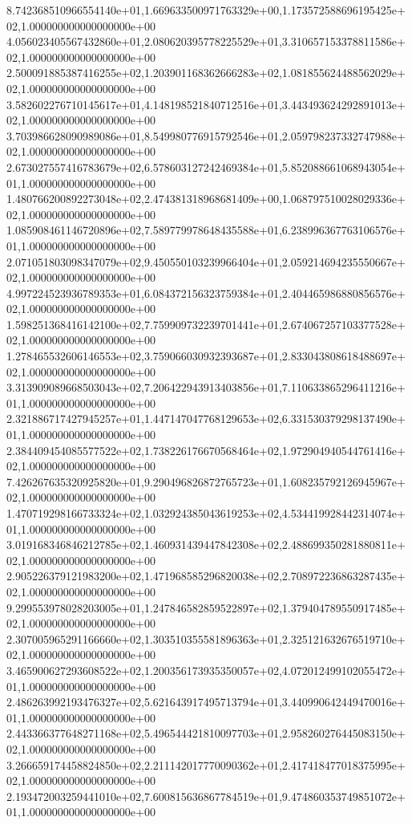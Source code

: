 8.742368510966554140e+01,1.669633500971763329e+00,1.173572588696195425e+02,1.000000000000000000e+00
4.056023405567432860e+01,2.080620395778225529e+01,3.310657153378811586e+02,1.000000000000000000e+00
2.500091885387416255e+02,1.203901168362666283e+02,1.081855624488562029e+02,1.000000000000000000e+00
3.582602276710145617e+01,4.148198521840712516e+01,3.443493624292891013e+02,1.000000000000000000e+00
3.703986628090989086e+01,8.549980776915792546e+01,2.059798237332747988e+02,1.000000000000000000e+00
2.673027557416783679e+02,6.578603127242469384e+01,5.852088661068943054e+01,1.000000000000000000e+00
1.480766200892273048e+02,2.474381318968681409e+00,1.068797510028029336e+02,1.000000000000000000e+00
1.085908461146720896e+02,7.589779978648435588e+01,6.238996367763106576e+01,1.000000000000000000e+00
2.071051803098347079e+02,9.450550103239966404e+01,2.059214694235550667e+02,1.000000000000000000e+00
4.997224523936789353e+01,6.084372156323759384e+01,2.404465986880856576e+02,1.000000000000000000e+00
1.598251368416142100e+02,7.759909732239701441e+01,2.674067257103377528e+02,1.000000000000000000e+00
1.278465532606146553e+02,3.759066030932393687e+01,2.833043808618488697e+02,1.000000000000000000e+00
3.313909089668503043e+02,7.206422943913403856e+01,7.110633865296411216e+01,1.000000000000000000e+00
2.321886717427945257e+01,1.447147047768129653e+02,6.331530379298137490e+01,1.000000000000000000e+00
2.384409454085577522e+02,1.738226176670568464e+02,1.972904940544761416e+02,1.000000000000000000e+00
7.426267635320925820e+01,9.290496826872765723e+01,1.608235792126945967e+02,1.000000000000000000e+00
1.470719298166733324e+02,1.032924385043619253e+02,4.534419928442314074e+01,1.000000000000000000e+00
3.019168346846212785e+02,1.460931439447842308e+02,2.488699350281880811e+02,1.000000000000000000e+00
2.905226379121983200e+02,1.471968585296820038e+02,2.708972236863287435e+02,1.000000000000000000e+00
9.299553978028203005e+01,1.247846582859522897e+02,1.379404789550917485e+02,1.000000000000000000e+00
2.307005965291166660e+02,1.303510355581896363e+01,2.325121632676519710e+02,1.000000000000000000e+00
3.465900627293608522e+02,1.200356173935350057e+02,4.072012499102055472e+01,1.000000000000000000e+00
2.486263992193476327e+02,5.621643917495713794e+01,3.440990642449470016e+01,1.000000000000000000e+00
2.443366377648271168e+02,5.496544421810097703e+01,2.958260276445083150e+02,1.000000000000000000e+00
3.266659174458824850e+02,2.211142017770090362e+01,2.417418477018375995e+02,1.000000000000000000e+00
2.193472003259441010e+02,7.600815636867784519e+01,9.474860353749851072e+01,1.000000000000000000e+00
